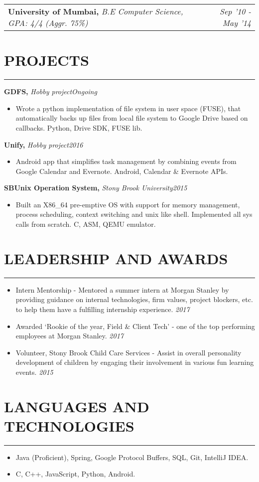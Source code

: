 \documentclass[12pt]{article}
\makeatletter
\newcommand{\sectionHeading}[1]{
\section*{\small{#1}}
\vspace{-8pt}
\hrule
\vspace{8pt}
}
\newcommand {\projectSectionSubheading}[3]{
    \noindent \small{\textbf{#1, }\textit{#2\hfill #3} }\vspace{-6pt}
}
\newcommand{\educationSectionSubheading}[3]{
    \vspace{-1pt}
    \noindent \begin{tabular*}{1.01\linewidth}{l@{\extracolsep{\fill}}r}
      \small{\textbf{#1, }\textit{#2}} & \small{\textit{#3}} \\
    \end{tabular*}\vspace{-8pt}
}
\newcommand{\sectionListStart}{\begin{itemize}[label={\small{\textbullet}},noitemsep]}
\newcommand{\sectionListEnd}{\end{itemize}}
\newcommand{\sectionListItem}[1]{\item \small{#1}}
\newcommand{\sectionListItemWithDate}[2]{\item \small{#1 \hfill \textit{#2}} \\\vspace{-10pt}}
\makeatother
\begin{document}
\educationSectionSubheading
{University of Mumbai}{B.E Computer Science, GPA: 4/4 (Aggr. 75\%)}{Sep '10 - May '14}


\sectionHeading{PROJECTS}
\projectSectionSubheading{GDFS}{Hobby project}{Ongoing}
\sectionListStart
    \sectionListItem
        Wrote a python implementation of file system in user space (FUSE), that automatically backs up files from local file system to Google Drive based on callbacks. Python, Drive SDK, FUSE lib.
\sectionListEnd

\projectSectionSubheading{Unify}{Hobby project}{2016}
\sectionListStart
    \sectionListItem
        Android app that simplifies task management by combining events from Google Calendar and Evernote. Android, Calendar \& Evernote APIs.
\sectionListEnd

\projectSectionSubheading{SBUnix Operation System}{Stony Brook University}{2015}
\sectionListStart
    \sectionListItem
        Built an X86\_64 pre-emptive OS with support for memory management, process scheduling, context switching and unix like shell. Implemented all sys calls from scratch. C, ASM, QEMU emulator.
        

\sectionListEnd

\sectionHeading{LEADERSHIP AND AWARDS}
\sectionListStart
    \sectionListItemWithDate
        {Intern Mentorship - Mentored a summer intern at Morgan Stanley by providing guidance on internal technologies, firm values, project blockers, etc. to help them have a fulfilling internship experience.}{2017} 
    \sectionListItemWithDate
        {Awarded `Rookie of the year, Field \& Client Tech' - one of the top performing employees at Morgan Stanley.}{2017}
    \sectionListItemWithDate
        {Volunteer, Stony Brook Child Care Services - Assist in overall personality development of children by engaging their involvement in various fun learning events.}{2015}
\sectionListEnd

\sectionHeading{LANGUAGES AND TECHNOLOGIES}
\sectionListStart
    \sectionListItem
        Java (Proficient), Spring, Google Protocol Buffers, SQL, Git, IntelliJ IDEA.
    \sectionListItem
        C, C++, JavaScript, Python, Android. 
\sectionListEnd

\end{document}
